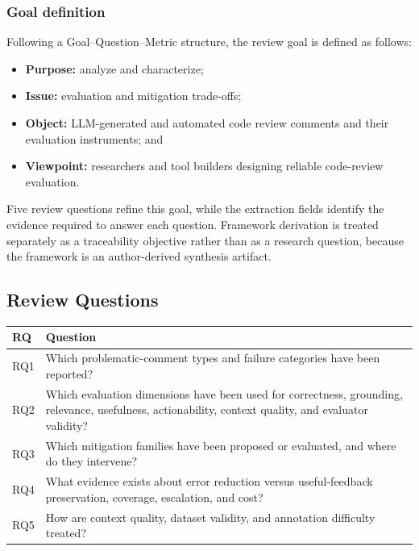 \documentclass[10pt]{article}
\begin{document}
\subsubsection{Goal definition}

Following a Goal--Question--Metric structure, the review goal is defined as follows:

\begin{itemize}
\item \textbf{Purpose:} analyze and characterize;
\item \textbf{Issue:} evaluation and mitigation trade-offs;
\item \textbf{Object:} LLM-generated and automated code review comments and their evaluation instruments; and
\item \textbf{Viewpoint:} researchers and tool builders designing reliable code-review evaluation.
\end{itemize}

Five review questions refine this goal, while the extraction fields identify the evidence required to answer each question. Framework derivation is treated separately as a traceability objective rather than as a research question, because the framework is an author-derived synthesis artifact.

\subsection{Review Questions}

\begin{table}[H]
\centering
\footnotesize
\renewcommand{\arraystretch}{1.18}
\begin{tabularx}{\linewidth}{@{}>{\raggedright\arraybackslash}p{0.55in}>{\raggedright\arraybackslash}X@{}}
\toprule
\rowcolor{ACMTableHead}
\textbf{RQ} & \textbf{Question} \\
\midrule
RQ1 & Which problematic-comment types and failure categories have been reported? \\
RQ2 & Which evaluation dimensions have been used for correctness, grounding, relevance, usefulness, actionability, context quality, and evaluator validity? \\
RQ3 & Which mitigation families have been proposed or evaluated, and where do they intervene? \\
RQ4 & What evidence exists about error reduction versus useful-feedback preservation, coverage, escalation, and cost? \\
RQ5 & How are context quality, dataset validity, and annotation difficulty treated? \\
\bottomrule
\end{tabularx}
\end{table}
\end{document}
